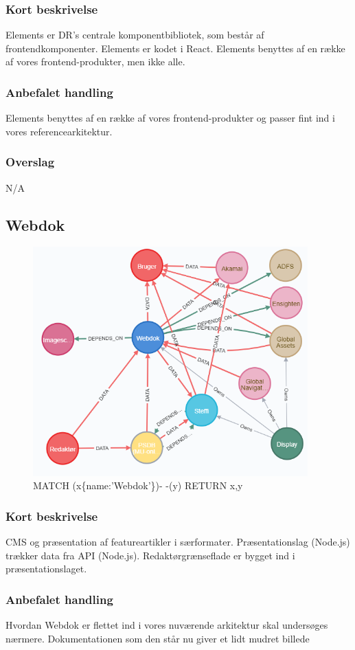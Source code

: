 \documentclass{article}
\begin{document}
\subsubsection{Kort beskrivelse}
Elements er DR's centrale komponentbibliotek, som består af frontendkomponenter. Elements er kodet i React. Elements benyttes af en række af vores frontend-produkter, men ikke alle.
\subsubsection{Anbefalet handling}
Elements benyttes af en række af vores frontend-produkter og passer fint ind i vores referencearkitektur.
\subsubsection{Overslag}
N/A

\subsection{Webdok}
\begin{figure}[h]
\includegraphics[width=300pt]{Webdok.PNG}
\caption{MATCH (x\{name:'Webdok'\})- -(y) RETURN x,y}
\end{figure}
\subsubsection{Kort beskrivelse}
CMS og præsentation af featureartikler i særformater.	
Præsentationslag (Node.js) trækker data fra API (Node.js). Redaktørgrænseflade er bygget ind i præsentationslaget.
\subsubsection{Anbefalet handling}
Hvordan Webdok er flettet ind i vores nuværende arkitektur skal undersøges nærmere. Dokumentationen som den står nu giver et lidt mudret billede
\end{document}
